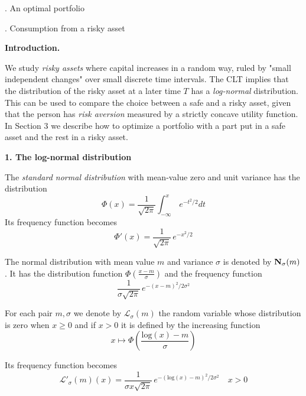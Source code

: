 \documentclass[12pt]{amsart}
\begin{document}
\bigskip 


. An optimal portfolio

\bigskip 


. Consumption from a risky asset


\bigskip 
















\bigskip 


\centerline {\bf Introduction.}
\bigskip 


\noindent
We 
 study \emph{risky assets}
where capital increases in a random way, ruled by "small 
independent changes" over small discrete time intervals. 
The CLT  implies that the distribution of the risky asset  at a later 
time $T$ has a \emph{log-normal} distribution.
This can be used to  compare the choice between a safe and a risky asset, given 
that the person has \emph{risk aversion} measured by a strictly 
concave utility function. 
In Section  3  we describe
how to optimize a portfolio with a part  put in a safe asset and the
rest in a risky asset.




\bigskip

\centerline{\bf 1. The log-normal distribution}
\bigskip

\noindent
The \emph{standard normal distribution} with mean-value
zero and unit variance  has the distribution
\[
\Phi(x)=\frac{1}{\sqrt{2\pi}}\int_{-\infty}^x
\, e^{-t^2/2} dt
\]
Its frequency function becomes
\[
\Phi'(x)=\frac{1}{\sqrt{2\pi}}
\, e^{-x^2/2} 
\]

\noindent
The normal distribution with mean value $m$ and variance $\sigma$ is denoted by ${\bf {N}}_\sigma(m)$.
It has the distribution function
$\Phi(\frac{x-m}{\sigma})$ and the  frequency function 
\[
\frac{1}{\sigma\sqrt{2\pi}}
\, e^{-(x-m)^2/2\sigma^2} 
\]

For each pair $m,\sigma$ we denote by $\mathcal L_\sigma(m)$
the random variable whose distribution is zero when $x\geq 0$ and if $x>0$ it is 
defined by the increasing function
\[
x\mapsto 
\Phi(\frac{\text{log}(x)-m}{\sigma})\tag{1}
 \]
\medskip 

\noindent 
Its frequency function becomes
 \[
\mathcal L'_\sigma(m)(x)=\frac{1}{\sigma x\sqrt{2\pi}}
\, e^{-(\text{log}(x)-m)^2/2\sigma^2} \quad x>0\tag{2}
\]
\end{document}
